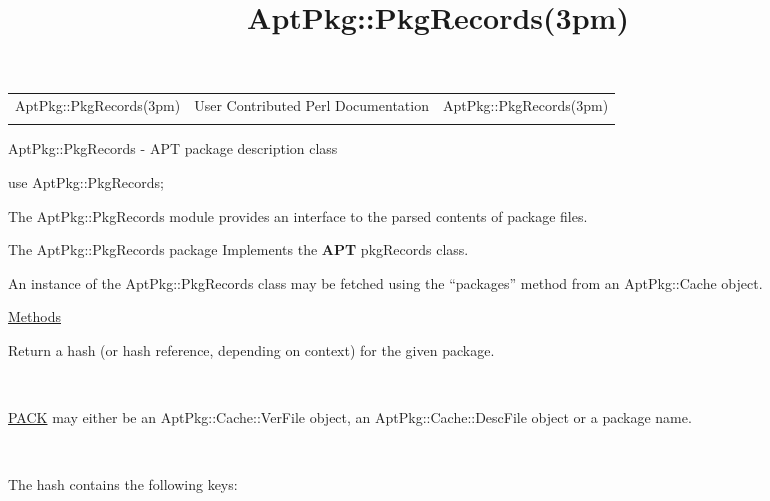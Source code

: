 \documentclass[]{article}
\title{AptPkg::PkgRecords(3pm)}
\author{}
\date{}
\let\realtextbf=\textbf
\renewcommand{\textbf}[1]{\textcolor{boldcolor}{\realtextbf{#1}}}
\renewcommand{\emph}[1]{\underline{#1}}
\begin{document}
\maketitle

\begin{longtable}[c]{@{}lll@{}}
\toprule\addlinespace
AptPkg::PkgRecords(3pm) & User Contributed Perl Documentation &
AptPkg::PkgRecords(3pm)
\\\addlinespace
\bottomrule
\end{longtable}


AptPkg::PkgRecords - APT package description class


use AptPkg::PkgRecords;


The AptPkg::PkgRecords module provides an interface to the parsed
contents of package files.


The AptPkg::PkgRecords package Implements the \textbf{APT} pkgRecords
class.

An instance of the AptPkg::PkgRecords class may be fetched using the
``packages'' method from an AptPkg::Cache object.

\emph{Methods}

\begin{description}
\itemsep1pt\parskip0pt
\item[lookup(\emph{PACK})]
Return a hash (or hash reference, depending on context) for the given
package.

~

\emph{PACK} may either be an AptPkg::Cache::VerFile object, an
AptPkg::Cache::DescFile object or a package name.

~

The hash contains the following keys:
\end{description}
\end{document}
